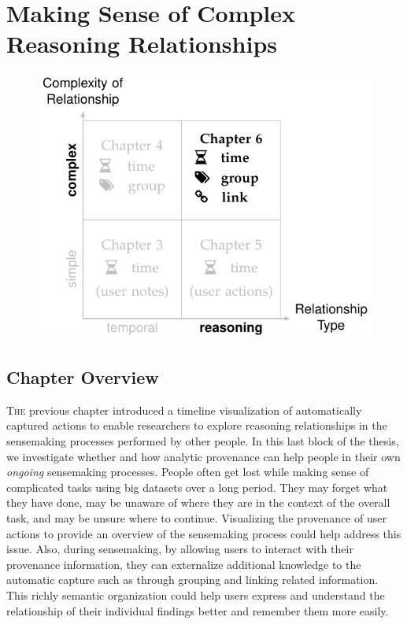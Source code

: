 \chapter{Making Sense of Complex Reasoning Relationships}
\label{chap:sensemap}

\graphicspath{{Chapter6/figures/}}

\vspace{.7in}

\begin{figure}[!h]
	\centering
	\includegraphics{work}
\end{figure}

\pagebreak

\section{Chapter Overview}
\lettrine{T}{he} previous chapter introduced a timeline visualization of automatically captured actions to enable researchers to explore reasoning relationships in the sensemaking processes performed by other people. In this last block of the thesis, we investigate whether and how analytic provenance can help people in their own \emph{ongoing} sensemaking processes. People often get lost while making sense of complicated tasks using big datasets over a long period. They may forget what they have done, may be unaware of where they are in the context of the overall task, and may be unsure where to continue. Visualizing the provenance of user actions to provide an overview of the sensemaking process could help address this issue. Also, during sensemaking, by allowing users to interact with their provenance information, they can externalize additional knowledge to the automatic capture such as through grouping and linking related information. This richly semantic organization could help users express and understand the relationship of their individual findings better and remember them more easily.

